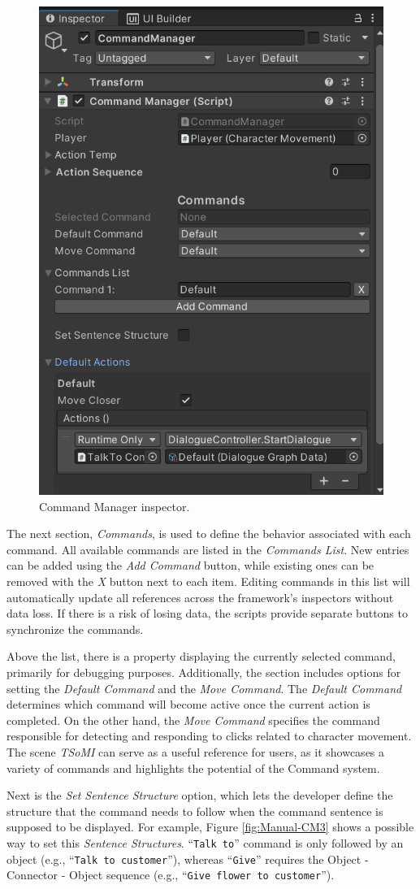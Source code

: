 \begin{figure}[H]
\centering
\includegraphics[width=.6\linewidth]{img/User doc/command_manager.png}
\caption{Command Manager inspector.}
\label{fig:Manual-CM}
\end{figure}

The next section, \textit{Commands}, is used to define the behavior associated with each command. All available commands are listed in the \textit{Commands List}. New entries can be added using the \textit{Add Command} button, while existing ones can be removed with the \textit{X} button next to each item. Editing commands in this list will automatically update all references across the framework’s inspectors without data loss. If there is a risk of losing data, the scripts provide separate buttons to synchronize the commands.

Above the list, there is a property displaying the currently selected command, primarily for debugging purposes. Additionally, the section includes options for setting the \textit{Default Command} and the \textit{Move Command}. The \textit{Default Command} determines which command will become active once the current action is completed. On the other hand, the \textit{Move Command} specifies the command responsible for detecting and responding to clicks related to character movement. The scene \textit{TSoMI} can serve as a useful reference for users, as it showcases a variety of commands and highlights the potential of the Command system.

Next is the \textit{Set Sentence Structure} option, which lets the developer define the structure that the command needs to follow when the command sentence is supposed to be displayed. For example, Figure \ref{fig:Manual-CM3} shows a possible way to set this \textit{Sentence Structures}. “\verb|Talk to|” command is only followed by an object (e.g., “\verb|Talk to customer|”), whereas “\verb|Give|” requires the Object - Connector - Object sequence (e.g., “\verb|Give flower to customer|”).

